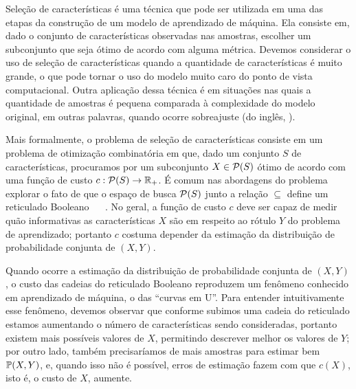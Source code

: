 
Seleção de características é uma técnica que pode ser utilizada em uma 
das etapas da construção de um modelo de aprendizado de máquina. Ela 
consiste em, dado o conjunto de características observadas nas amostras,
escolher um subconjunto que seja ótimo de acordo com alguma métrica. 
Devemos considerar o uso de seleção de características quando a 
quantidade de características é muito grande, o que pode tornar o uso do
modelo muito caro do ponto de vista computacional. Outra aplicação dessa 
técnica é em situações nas quais a quantidade de amostras é pequena 
comparada à complexidade do modelo original, em outras palavras, quando 
ocorre sobreajuste (do inglês, ).

Mais formalmente, o problema de seleção de características consiste em
um problema de otimização combinatória em que, dado um conjunto $S$ de 
características, procuramos por um subconjunto $X \in \mathcal{P} (S)$
ótimo de acordo com uma função de custo $c : \mathcal{P}(S) \to 
\mathbb{R}_{+}$. É comum nas abordagens do problema explorar o
fato de que o espaço de busca $\mathcal{P}(S)$ junto a relação $\subseteq$
define um reticulado Booleano ~\cite{Rei12} ~\cite{AG+18}. No geral, a 
função de custo $c$ deve ser capaz de medir quão informativas as 
características $X$ são em respeito ao rótulo $Y$ do problema de 
aprendizado; portanto $c$ costuma depender da estimação da distribuição 
de probabilidade conjunta de $(X, Y)$.

Quando ocorre a estimação da distribuição de probabilidade conjunta de 
$(X, Y)$, o custo das cadeias do reticulado Booleano reproduzem um
fenômeno conhecido em aprendizado de máquina, o das ``curvas em U''. 
Para entender intuitivamente esse fenômeno, devemos observar que 
conforme subimos uma cadeia do reticulado estamos aumentando o número de
características sendo consideradas, portanto existem mais possíveis
valores de $X$, permitindo descrever melhor os valores de $Y$; por outro
lado, também precisaríamos de mais amostras para estimar bem 
$\mathbb{P} (X, Y)$, e, quando isso não é possível, erros de estimação
fazem com que $c(X)$, isto é, o custo de $X$, aumente.

